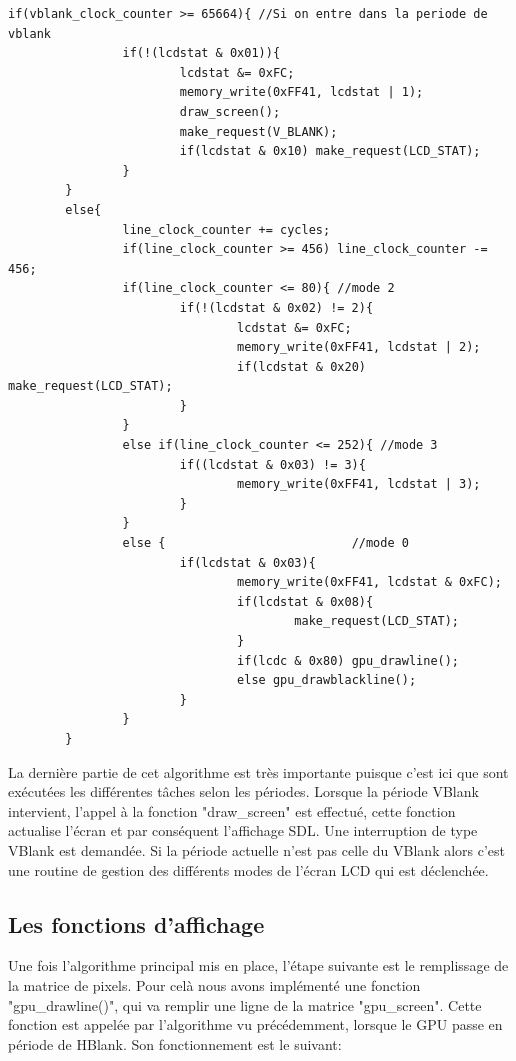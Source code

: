 \documentclass{report}
\begin{document}
\begin{lstlisting}
if(vblank_clock_counter >= 65664){ //Si on entre dans la periode de vblank
                if(!(lcdstat & 0x01)){
                        lcdstat &= 0xFC;
                        memory_write(0xFF41, lcdstat | 1);
                        draw_screen();
                        make_request(V_BLANK);
                        if(lcdstat & 0x10) make_request(LCD_STAT);
                }
        }
        else{
                line_clock_counter += cycles;
                if(line_clock_counter >= 456) line_clock_counter -= 456;
                if(line_clock_counter <= 80){ //mode 2
                        if(!(lcdstat & 0x02) != 2){
                                lcdstat &= 0xFC;
                                memory_write(0xFF41, lcdstat | 2);
                                if(lcdstat & 0x20) make_request(LCD_STAT);
                        }
                }
                else if(line_clock_counter <= 252){ //mode 3
                        if((lcdstat & 0x03) != 3){
                                memory_write(0xFF41, lcdstat | 3);
                        }
                }
                else {                          //mode 0 
                        if(lcdstat & 0x03){
                                memory_write(0xFF41, lcdstat & 0xFC);
                                if(lcdstat & 0x08){
                                        make_request(LCD_STAT);
                                }
                                if(lcdc & 0x80) gpu_drawline();
                                else gpu_drawblackline();
                        }
                }
        }

\end{lstlisting}
La dernière partie de cet algorithme est très importante puisque c'est ici que sont exécutées les différentes tâches selon les périodes. Lorsque la période VBlank intervient, l'appel à la fonction "draw\_screen" est effectué, cette fonction actualise l'écran et par conséquent l'affichage SDL. Une interruption de type VBlank est demandée. Si la période actuelle n'est pas celle du VBlank alors c'est une routine de gestion des différents modes de l'écran LCD qui est déclenchée.\\

\subsection{Les fonctions d'affichage}
Une fois l'algorithme principal mis en place, l'étape suivante est le remplissage de la matrice de pixels. Pour celà nous avons implémenté une fonction "gpu\_drawline()", qui va remplir une ligne de la matrice "gpu\_screen". Cette fonction est appelée par l'algorithme vu précédemment, lorsque le GPU passe en période de HBlank. Son fonctionnement est le suivant:\\
\end{document}
